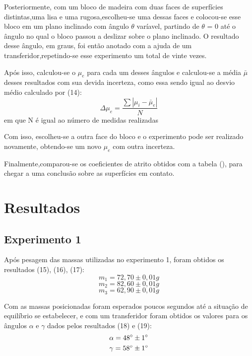 \documentclass[12pt, letterpaper]{article}
\begin{document}
Posteriormente, com um bloco de madeira com duas faces de superfícies distintas,uma lisa e uma rugosa,escolheu-se uma dessas faces e colocou-se esse bloco em um plano inclinado com ângulo $\theta$ varíavel, partindo de $\theta$ = $0$ até o ângulo no qual o bloco passou a deslizar sobre o plano inclinado. O resultado desse ângulo, em graus, foi então anotado com a ajuda de um transferidor,repetindo-se esse experimento um total de vinte vezes.


Após isso, calculou-se o $\mu_e$ para cada um desses ângulos e calculou-se a média $\bar\mu$ desses resultados com sua devida incerteza, como essa sendo igual ao desvio médio calculado por (14):
\begin{equation}
        \Delta\mu_e = \frac{\sum |\mu_{i} - \bar \mu_e|}{N}
    \end{equation}
em que N é igual ao número de medidas realizadas

Com isso, escolheu-se a outra face do bloco e o experimento pode ser realizado novamente, obtendo-se um novo $\mu_e$ com outra incerteza.

Finalmente,comparou-se os coeficientes de atrito obtidos com a tabela (), para chegar a uma conclusão sobre as superfícies em contato.
\section{Resultados}
\subsection{Experimento 1}
    Após pesagem das massas utilizadas no experimento 1, foram obtidos os resultados (15), (16), (17):
    \begin{equation}
        m_{1} = 72,70 \pm 0,01g
    \end{equation}
    \begin{equation}
        m_{2} = 82,60 \pm 0,01g
    \end{equation}
    \begin{equation}
        m_{3} = 62,90 \pm 0,01g
    \end{equation}

    Com as massas posicionadas foram esperados poucos segundos até a situação de equilíbrio se estabelecer, e com um transferidor foram obtidos os valores para os ângulos $\alpha$ e $\gamma$ dados pelos resultados (18) e (19):
    \begin{equation}
        \alpha = 48 \degree \pm 1 \degree
    \end{equation}
    \begin{equation}
        \gamma = 58 \degree \pm 1 \degree
    \end{equation}
\end{document}
